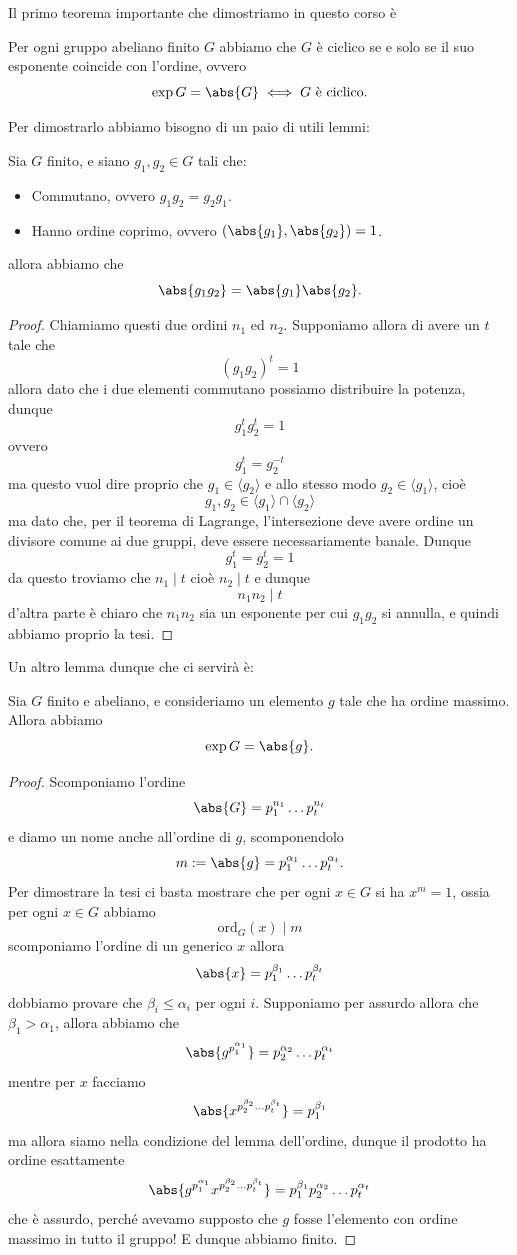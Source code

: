 \documentclass[11pt]{scrartcl}
\newcommand{\ordine}[2]{\text{ord}_{#1}\left(#2\right)}
\begin{document}
	Il primo teorema importante che dimostriamo in questo corso è
	\begin{theorem*}
		Per ogni gruppo abeliano finito $G$ abbiamo che $G$ è ciclico se e solo se il suo esponente coincide con l'ordine, ovvero
		$$\exp G = \abs{G} \iff G \text{ è ciclico}.$$
	\end{theorem*}
	Per dimostrarlo abbiamo bisogno di un paio di utili lemmi:
	\begin{lemma}
		Sia $G$ finito, e siano $g_1,g_2\in G$ tali che:
		\begin{itemize}
			\item Commutano, ovvero $g_1g_2=g_2g_1$.
			\item Hanno ordine coprimo, ovvero $(\abs{g_1},\abs{g_2})=1$.
		\end{itemize}
		allora abbiamo che 
		$$\abs{g_1g_2}=\abs{g_1}\abs{g_2}.$$
	\end{lemma}
	\begin{proof}
		Chiamiamo questi due ordini $n_1$ ed $n_2$. Supponiamo allora di avere un $t$ tale che
		$$\left(g_1g_2\right)^t=1$$
		allora dato che i due elementi commutano possiamo distribuire la potenza, dunque
		$$g_1^tg_2^t=1$$
		ovvero
		$$g_1^t=g_2^{-t}$$
		ma questo vuol dire proprio che $g_1\in \langle g_2\rangle$ e allo stesso modo $g_2\in \langle g_1 \rangle$, cioè 
		$$g_1,g_2\in \langle g_1 \rangle \cap \langle g_2 \rangle$$
		ma dato che, per il teorema di Lagrange, l'intersezione deve avere ordine un divisore comune ai due gruppi, deve essere necessariamente banale. Dunque
		$$g_1^t=g_2^t=1$$
		da questo troviamo che $n_1\mid t$ cioè $n_2\mid t$ e dunque 
		$$n_1n_2\mid t$$
		d'altra parte è chiaro che $n_1n_2$ sia un esponente per cui $g_1g_2$ si annulla, e quindi abbiamo proprio la tesi.
	\end{proof}
	Un altro lemma dunque che ci servirà è:
	\begin{lemma}
		Sia $G$ finito e abeliano, e consideriamo un elemento $g$ tale che ha ordine massimo. Allora abbiamo
		$$\exp G = \abs{g}.$$
	\end{lemma}
	\begin{proof}
		Scomponiamo l'ordine
		$$\abs{G}=p_1^{n_1}\dots p_t^{n_t}$$
		e diamo un nome anche all'ordine di $g$, scomponendolo
		$$m:=\abs{g}=p_1^{\alpha_1}\dots p_t^{\alpha_t}.$$
		Per dimostrare la tesi ci basta mostrare che per ogni $x\in G$ si ha $x^m=1$, ossia per ogni $x\in G$ abbiamo
		$$\ordine{G}{x}\mid m$$
		scomponiamo l'ordine di un generico $x$ allora
		$$\abs{x}=p_1^{\beta_1}\dots p_t^{\beta_t}$$
		dobbiamo provare che $\beta_i\le \alpha_i$ per ogni $i$. Supponiamo per assurdo allora che $\beta_1> \alpha_1$, allora abbiamo che
		$$\abs{g^{p_1^{\alpha_1}}}=p_2^{\alpha_2}\dots p_t^{\alpha_t}$$
		mentre per $x$ facciamo
		$$\abs{x^{p_2^{\beta_2}\dots p_t^{\beta_t}}}=p_1^{\beta_1}$$
		ma allora siamo nella condizione del lemma dell'ordine, dunque il prodotto ha ordine esattamente
		$$\abs{g^{p_1^{\alpha_1}}x^{p_2^{\beta_2}\dots p_t^{\beta_t}}}=p_1^{\beta_1}p_2^{\alpha_2}\dots p_t^{\alpha_t}$$
		che è assurdo, perché avevamo supposto che $g$ fosse l'elemento con ordine massimo in tutto il gruppo! E dunque abbiamo finito.
	\end{proof}
\end{document}
